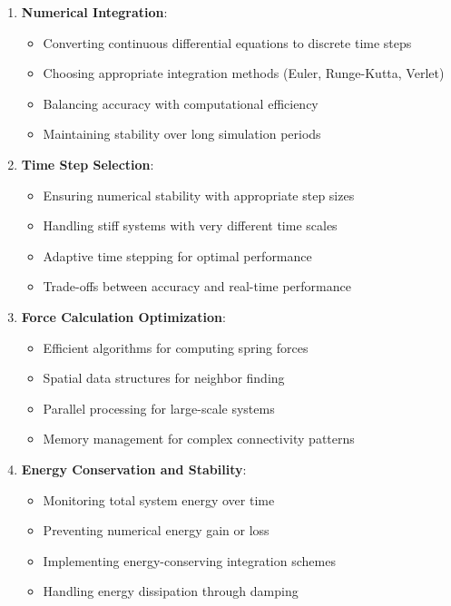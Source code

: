 \begin{enumerate}
    \item \textbf{Numerical Integration}:
    \begin{itemize}
        \item Converting continuous differential equations to discrete time steps
        \item Choosing appropriate integration methods (Euler, Runge-Kutta, Verlet)
        \item Balancing accuracy with computational efficiency
        \item Maintaining stability over long simulation periods
    \end{itemize}
    
    \item \textbf{Time Step Selection}:
    \begin{itemize}
        \item Ensuring numerical stability with appropriate step sizes
        \item Handling stiff systems with very different time scales
        \item Adaptive time stepping for optimal performance
        \item Trade-offs between accuracy and real-time performance
    \end{itemize}
    
    \item \textbf{Force Calculation Optimization}:
    \begin{itemize}
        \item Efficient algorithms for computing spring forces
        \item Spatial data structures for neighbor finding
        \item Parallel processing for large-scale systems
        \item Memory management for complex connectivity patterns
    \end{itemize}
    
    \item \textbf{Energy Conservation and Stability}:
    \begin{itemize}
        \item Monitoring total system energy over time
        \item Preventing numerical energy gain or loss
        \item Implementing energy-conserving integration schemes
        \item Handling energy dissipation through damping
    \end{itemize}
\end{enumerate}

